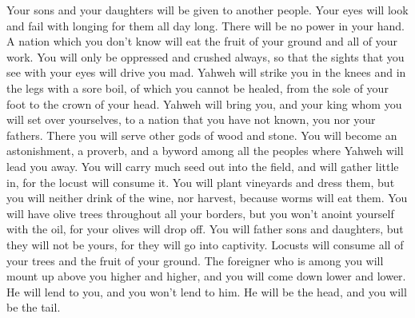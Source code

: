  Your sons and your daughters will be given to another
people. Your eyes will look and fail with longing for them all day long.
There will be no power in your hand.  A nation which you
don't know will eat the fruit of your ground and all of your work. You
will only be oppressed and crushed always,  so that the
sights that you see with your eyes will drive you mad. 
Yahweh will strike you in the knees and in the legs with a sore boil, of
which you cannot be healed, from the sole of your foot to the crown of
your head.  Yahweh will bring you, and your king whom you
will set over yourselves, to a nation that you have not known, you nor
your fathers. There you will serve other gods of wood and stone.
 You will become an astonishment, a proverb, and a byword
among all the peoples where Yahweh will lead you away.  You
will carry much seed out into the field, and will gather little in, for
the locust will consume it.  You will plant vineyards and
dress them, but you will neither drink of the wine, nor harvest, because
worms will eat them.  You will have olive trees throughout
all your borders, but you won't anoint yourself with the oil, for your
olives will drop off.  You will father sons and daughters,
but they will not be yours, for they will go into captivity.
 Locusts will consume all of your trees and the fruit of
your ground.  The foreigner who is among you will mount up
above you higher and higher, and you will come down lower and lower.
 He will lend to you, and you won't lend to him. He will be
the head, and you will be the tail.

